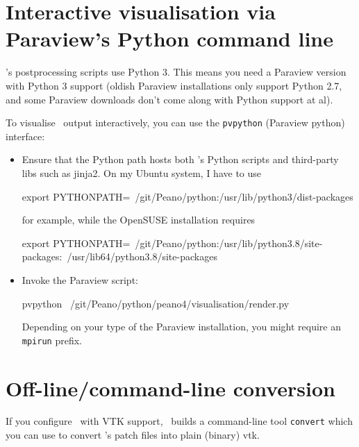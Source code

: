 \section{Interactive visualisation via Paraview's Python command line}
\label{section:postproce ssing:python-command-line}

\begin{remark}
  \Peano's postprocessing scripts use Python 3. This means you need a Paraview
  version with Python 3 support (oldish Paraview installations only support
  Python 2.7, and some Paraview downloads don't come along with Python support
  at al).
\end{remark}


\noindent
To visualise \Peano\ output interactively, you can use the \texttt{pvpython}
(Paraview python) interface:

\begin{itemize}
  \item Ensure that the Python path hosts both \Peano's Python scripts and
  third-party libs such as jinja2. On my Ubuntu system, I have to use
  \begin{code}
export PYTHONPATH=~/git/Peano/python:/usr/lib/python3/dist-packages  
  \end{code}
  for example, while the OpenSUSE installation requires
  \begin{code}
export PYTHONPATH=~/git/Peano/python:/usr/lib/python3.8/site-packages:\
/usr/lib64/python3.8/site-packages
  \end{code}
  \item Invoke the Paraview script:
  \begin{code}
pvpython ~/git/Peano/python/peano4/visualisation/render.py  
  \end{code}
  Depending on your type of the Paraview installation, you might require an
  \texttt{mpirun} prefix.
\end{itemize}

% 



\section{Off-line/command-line conversion}
\label{section:postprocessing:command-line}


\begin{remark}
  If you configure \Peano\ with VTK support, \Peano\ builds a command-line tool
  \texttt{convert} which you can use to convert \Peano 's patch files into plain
  (binary) vtk.
\end{remark}



